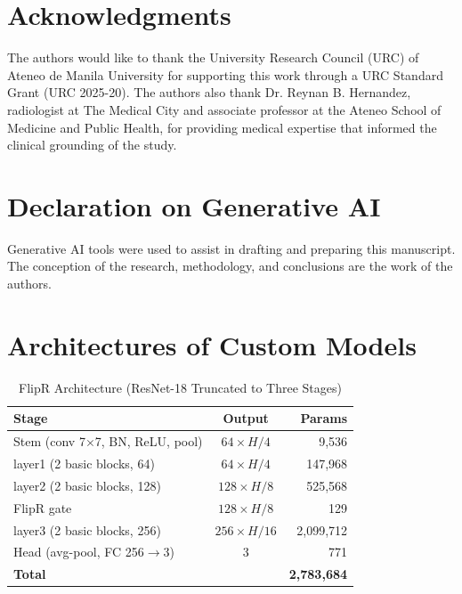 \documentclass[conference, letterpaper]{IEEEtran}
\begin{document}
\section*{Acknowledgments}

The authors would like to thank the University Research Council (URC) of Ateneo de Manila University for supporting this work through a URC Standard Grant (URC 2025-20). The authors also thank Dr. Reynan B. Hernandez, radiologist at The Medical City and associate professor at the Ateneo School of Medicine and Public Health, for providing medical expertise that informed the clinical grounding of the study.

\section*{Declaration on Generative AI}

Generative AI tools were used to assist in drafting and preparing this manuscript. The conception of the research, methodology, and conclusions are the work of the authors.

\appendices
\section{Architectures of Custom Models}
\label{app:architectures}

\begin{table}[!ht]
\renewcommand{\arraystretch}{1.2}
\centering
\begin{threeparttable}
\caption{FlipR Architecture (ResNet-18 Truncated to Three Stages)}
\label{tab:arch_flipr}
\footnotesize
\begin{tabular}{@{}l c r@{}}
\toprule
\textbf{Stage} & \textbf{Output} & \textbf{Params} \\
\midrule
Stem (conv 7$\times$7, BN, ReLU, pool) & $64\times H/4$ & 9,536 \\
layer1 (2 basic blocks, 64) & $64\times H/4$ & 147,968 \\
layer2 (2 basic blocks, 128) & $128\times H/8$ & 525,568 \\
FlipR gate & $128\times H/8$ & 129 \\
layer3 (2 basic blocks, 256) & $256\times H/16$ & 2,099,712 \\
Head (avg-pool, FC 256$\to$3) & 3 & 771 \\
\midrule
\textbf{Total} & & \textbf{2,783,684} \\
\bottomrule
\end{tabular}
\end{threeparttable}
\end{table}
\end{document}
